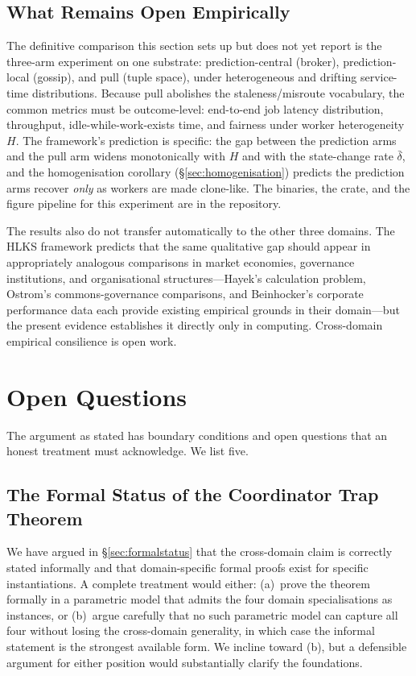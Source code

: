 \documentclass[11pt]{article}
\theoremstyle{definition}
\theoremstyle{plain}
\theoremstyle{plain}
\begin{document}
\subsection{What Remains Open Empirically}

The definitive comparison this section sets up but does not yet report is
the three-arm experiment on one substrate: prediction-central (broker),
prediction-local (gossip), and pull (tuple space), under heterogeneous and
drifting service-time distributions. Because pull abolishes the
staleness/misroute vocabulary, the common metrics must be outcome-level:
end-to-end job latency distribution, throughput, idle-while-work-exists
time, and fairness under worker heterogeneity $H$. The framework's
prediction is specific: the gap between the prediction arms and the pull
arm widens monotonically with $H$ and with the state-change rate
$\bar{\delta}$, and the homogenisation corollary
(\S\ref{sec:homogenisation}) predicts the prediction arms recover
\emph{only} as workers are made clone-like. The binaries, the crate, and
the figure pipeline for this experiment are in the repository.

The results also do not transfer automatically to the other three domains.
The HLKS framework predicts that the same qualitative gap should appear in
appropriately analogous comparisons in market economies, governance
institutions, and organisational structures---Hayek's calculation problem,
Ostrom's commons-governance comparisons, and Beinhocker's corporate
performance data each provide existing empirical grounds in their
domain---but the present evidence establishes it directly only in
computing. Cross-domain empirical consilience is open work.

\section{Open Questions}
\label{sec:open}

The argument as stated has boundary conditions and open questions that an
honest treatment must acknowledge. We list five.

\subsection{The Formal Status of the Coordinator Trap Theorem}

We have argued in \S\ref{sec:formalstatus} that the cross-domain claim is
correctly stated informally and that domain-specific formal proofs exist for
specific instantiations. A complete treatment would either: (a)~prove the
theorem formally in a parametric model that admits the four domain
specialisations as instances, or (b)~argue carefully that no such parametric
model can capture all four without losing the cross-domain generality, in
which case the informal statement is the strongest available form. We
incline toward (b), but a defensible argument for either position would
substantially clarify the foundations.
\end{document}
